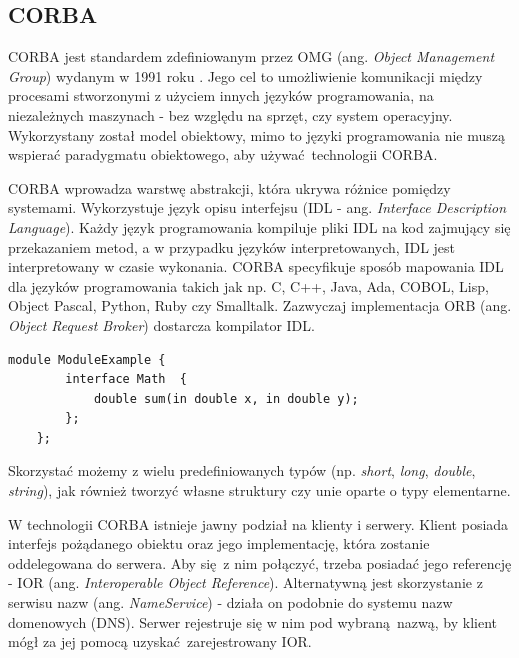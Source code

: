 \subsection{CORBA}

CORBA jest standardem zdefiniowanym przez OMG (ang. \textit{Object Management Group}) wydanym w 1991 roku \cite{CORBA}. Jego cel to umożliwienie komunikacji między procesami stworzonymi z użyciem innych języków programowania, na niezależnych maszynach - bez względu na sprzęt, czy system operacyjny. Wykorzystany został model obiektowy, mimo to języki programowania nie muszą wspierać paradygmatu obiektowego, aby używać technologii CORBA.

CORBA wprowadza warstwę abstrakcji, która ukrywa różnice pomiędzy systemami. Wykorzystuje język opisu interfejsu (IDL - ang. \textit{Interface Description Language}). Każdy język programowania kompiluje pliki IDL na kod zajmujący się przekazaniem metod, a w przypadku języków interpretowanych, IDL jest interpretowany w czasie wykonania. CORBA specyfikuje sposób mapowania IDL dla języków programowania takich jak np. C, C++, Java, Ada, COBOL, Lisp, Object Pascal, Python, Ruby czy Smalltalk. Zazwyczaj implementacja ORB (ang. \textit{Object Request Broker}) dostarcza kompilator IDL.


\begin{lstlisting}[caption={Przykład użycia IDL},captionpos=b]
    module ModuleExample {
        interface Math  {
            double sum(in double x, in double y);
        };
    };
\end{lstlisting}


Skorzystać możemy z wielu predefiniowanych typów (np. \textit{short}, \textit{long}, \textit{double}, \textit{string}), jak również tworzyć własne struktury czy unie oparte o typy elementarne.

W technologii CORBA istnieje jawny podział na klienty i serwery. Klient posiada interfejs pożądanego obiektu oraz jego implementację, która zostanie oddelegowana do serwera. Aby się z nim połączyć, trzeba posiadać jego referencję - IOR (ang. \textit{Interoperable Object Reference}). Alternatywną jest skorzystanie z serwisu nazw (ang. \textit{NameService}) - działa on podobnie do systemu nazw domenowych (DNS). Serwer rejestruje się w nim pod wybraną nazwą, by klient mógł za jej pomocą uzyskać zarejestrowany IOR.

